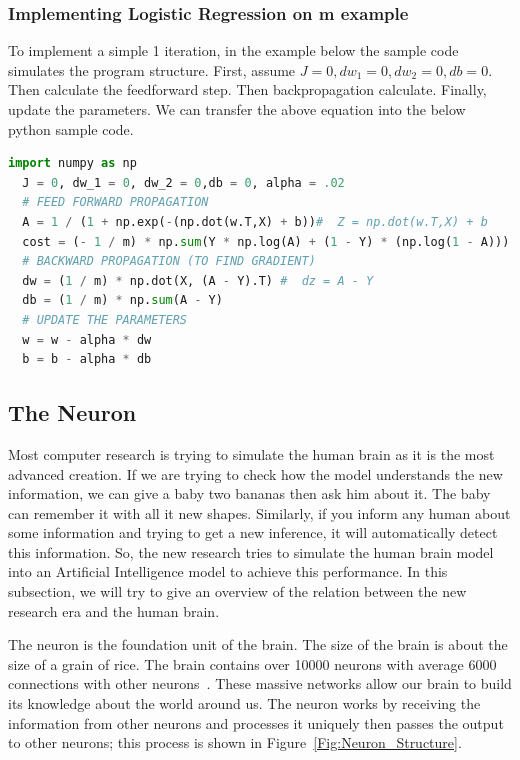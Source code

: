 \subsubsection{Implementing Logistic Regression on m example}
To implement a simple 1 iteration, in the example below the sample code simulates the program structure. First, assume $J = 0, dw_1 = 0, dw_2 = 0,db = 0$. Then calculate the feedforward step. Then backpropagation calculate. Finally, update the parameters. We can transfer the above equation into the below python sample code.%
 \begin{lstlisting}[language=Python]
  import numpy as np
  J = 0, dw_1 = 0, dw_2 = 0,db = 0, alpha = .02
  # FEED FORWARD PROPAGATION
  A = 1 / (1 + np.exp(-(np.dot(w.T,X) + b))#  Z = np.dot(w.T,X) + b
  cost = (- 1 / m) * np.sum(Y * np.log(A) + (1 - Y) * (np.log(1 - A)))
  # BACKWARD PROPAGATION (TO FIND GRADIENT)
  dw = (1 / m) * np.dot(X, (A - Y).T) #  dz = A - Y
  db = (1 / m) * np.sum(A - Y)
  # UPDATE THE PARAMETERS
  w = w - alpha * dw
  b = b - alpha * db
 \end{lstlisting}%
%
\subsection{The Neuron}

Most computer research is trying to simulate the human brain as it is the most advanced creation. If we are trying to check how the model understands the new information, we can give a baby two bananas then ask him about it. The baby can remember it with all it new shapes. Similarly, if you inform any human about some information and trying to get a new inference, it will automatically detect this information. So, the new research tries to simulate the human brain model into an Artificial Intelligence model to achieve this performance. In this subsection, we will try to give an overview of the relation between the new research era and the human brain.
 
The neuron is the foundation unit of the brain. The size of the brain is about the size of a grain of rice. The brain contains over 10000 neurons with average 6000 connections with other neurons~\cite{Restak_2001}.  These massive networks allow our brain to build its knowledge about the world around us. The neuron works by receiving the information from other neurons and processes it uniquely then passes the output to other neurons; this process is shown in Figure~\ref{Fig:Neuron_Structure}.%

